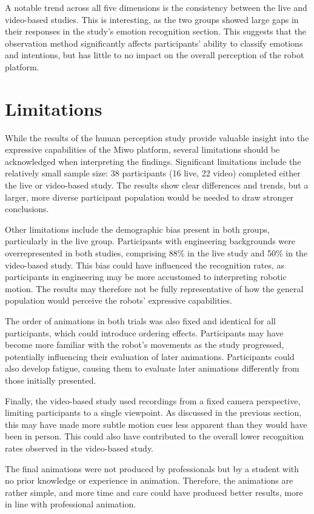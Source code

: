 A notable trend across all five dimensions is the consistency between the live and video-based studies. This is interesting, as the two groups showed large gaps in their responses in the study's emotion recognition section. This suggests that the observation method significantly affects participants' ability to classify emotions and intentions, but has little to no impact on the overall perception of the robot platform.

\section{Limitations}
While the results of the human perception study provide valuable insight into the expressive capabilities of the Miwo platform, several limitations should be acknowledged when interpreting the findings.
Significant limitations include the relatively small sample size: 38 participants (16 live, 22 video) completed either the live or video-based study. The results show clear differences and trends, but a larger, more diverse participant population would be needed to draw stronger conclusions.

Other limitations include the demographic bias present in both groups, particularly in the live group. Participants with engineering backgrounds were overrepresented in both studies, comprising 88\% in the live study and 50\% in the video-based study. This bias could have influenced the recognition rates, as participants in engineering may be more accustomed to interpreting robotic motion. The results may therefore not be fully representative of how the general population would perceive the robots' expressive capabilities.

The order of animations in both trials was also fixed and identical for all participants, which could introduce ordering effects. Participants may have become more familiar with the robot's movements as the study progressed, potentially influencing their evaluation of later animations. Participants could also develop fatigue, causing them to evaluate later animations differently from those initially presented.

Finally, the video-based study used recordings from a fixed camera perspective, limiting participants to a single viewpoint. As discussed in the previous section, this may have made more subtle motion cues less apparent than they would have been in person. This could also have contributed to the overall lower recognition rates observed in the video-based study.

The final animations were not produced by professionals but by a student with no prior knowledge or experience in animation. Therefore, the animations are rather simple, and more time and care could have produced better results, more in line with professional animation.

